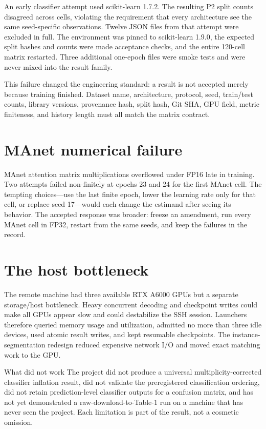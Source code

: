\documentclass[11pt,oneside]{report}
\newcommand{\protocol}[1]{\textsf{#1}}
\begin{document}
An early classifier attempt used scikit-learn 1.7.2. The resulting \protocol{P2} split counts disagreed across cells, violating the requirement that every architecture see the same seed-specific observations. Twelve JSON files from that attempt were excluded in full. The environment was pinned to scikit-learn 1.9.0, the expected split hashes and counts were made acceptance checks, and the entire 120-cell matrix restarted. Three additional one-epoch files were smoke tests and were never mixed into the result family.

This failure changed the engineering standard: a result is not accepted merely because training finished. Dataset name, architecture, protocol, seed, train/test counts, library versions, provenance hash, split hash, Git SHA, GPU field, metric finiteness, and history length must all match the matrix contract.

\section{MAnet numerical failure}

MAnet attention matrix multiplications overflowed under FP16 late in training. Two attempts failed non-finitely at epochs 23 and 24 for the first MAnet cell. The tempting choices---use the last finite epoch, lower the learning rate only for that cell, or replace seed 17---would each change the estimand after seeing its behavior. The accepted response was broader: freeze an amendment, run every MAnet cell in FP32, restart from the same seeds, and keep the failures in the record.

\section{The host bottleneck}

The remote machine had three available RTX A6000 GPUs but a separate storage/host bottleneck. Heavy concurrent decoding and checkpoint writes could make all GPUs appear slow and could destabilize the SSH session. Launchers therefore queried memory usage and utilization, admitted no more than three idle devices, used atomic result writes, and kept resumable checkpoints. The instance-segmentation redesign reduced expensive network I/O and moved exact matching work to the GPU.

\begin{decisionbox}{What did not work}
The project did not produce a universal multiplicity-corrected classifier inflation result, did not validate the preregistered classification ordering, did not retain prediction-level classifier outputs for a confusion matrix, and has not yet demonstrated a raw-download-to-Table-1 run on a machine that has never seen the project. Each limitation is part of the result, not a cosmetic omission.
\end{decisionbox}
\end{document}
